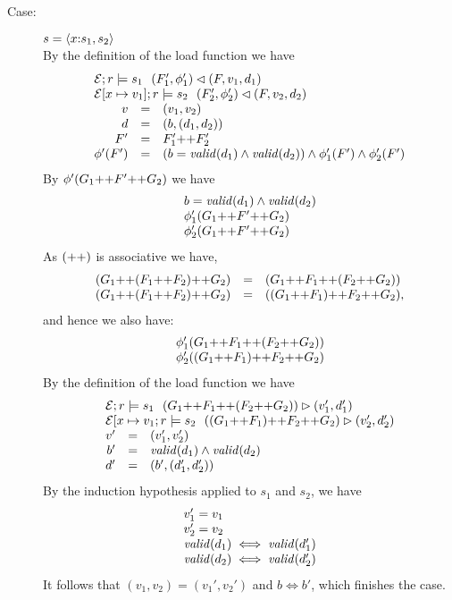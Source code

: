 {\begin{description}
\item[Case:] $s = \langle x {:} s_1, s_2 \rangle$\\[1ex]
%
By the definition of the load function we have
\[
\begin{array}{rcll}
\multicolumn{3}{l}{\store{\Env}{F}{r}{v_1,d_1}{s_1}{F_1',\phi_1'}}\\
\multicolumn{3}{l}{\store{\Env[x \mapsto v_1]}{F}{r}{v_2,d_2}{s_2}{F_2',\phi_2'}}\\
v &=& (v_1,v_2)\\
d &=& (b,(d_1,d_2))\\
F' &=& F_1' \FAppend F_2'\\
\phi'(F') &=& (b = \valid{d_1} \wedge \valid{d_2}) \wedge \phi_1'(F') \wedge \phi_2'(F')
\end{array}
\]
By $\phi'(G_1 \text{++} F' \text{++} G_2)$ we have
\[
\begin{array}{l}
b = \mathit{valid}(d_1) \wedge \mathit{valid}(d_2)\\
\phi_1'(G_1 \text{++} F' \text{++} G_2)\\
\phi_2'(G_1 \text{++} F' \text{++} G_2)\\
\end{array}
\]
%
As $(\text{++})$ is associative we have,
\[
\begin{array}{rcl}
(G_1\text{++} (F_1\text{++} F_2)\text{++} G_2) &=& (G_1\text{++} F_1\text{++} (F_2\text{++} G_2))\\
(G_1\text{++} (F_1\text{++} F_2)\text{++} G_2) &=& ((G_1\text{++} F_1)\text{++} F_2\text{++} G_2),\\
\end{array}
\]
and hence we also have:
\[
\begin{array}{l}
\phi_1'(G_1\text{++} F_1\text{++} (F_2\text{++} G_2))\\
\phi_2'((G_1\text{++} F_1)\text{++} F_2\text{++} G_2)\\
\end{array}
\]
By the definition of the load function we have 
\[ 
\begin{array}{rcll}
\multicolumn{3}{l}{\load{\Env}{(G_1 \FAppend F_1 \FAppend (F_2 \FAppend G_2))}{r}{s_1}{v_1',d_1'}}\\
\multicolumn{3}{l}{\load{\Env[x \mapsto v_1}{((G_1 \FAppend F_1) \FAppend F_2 \FAppend G_2)}{r}{s_2}{v_2',d_2'}}\\
v' &=& (v_1',v_2')\\
b' &= & \valid{d_1} \wedge \valid{d_2}\\
d' &=& (b',(d_1',d_2'))\\
\end{array}
\]
%
By the induction hypothesis applied to $s_1$ and $s_2$, we have 
\[
\begin{array}{l}
v_1' = v_1\\
v_2' = v_2\\
\mathit{valid}(d_1) \iff \mathit{valid}(d_1')\\
\mathit{valid}(d_2) \iff \mathit{valid}(d_2')\\
\end{array}
\]
It follows that $(v_1,v_2) = (v_1',v_2')$ and $b \iff b'$, which
finishes the case.


\end{description}}
